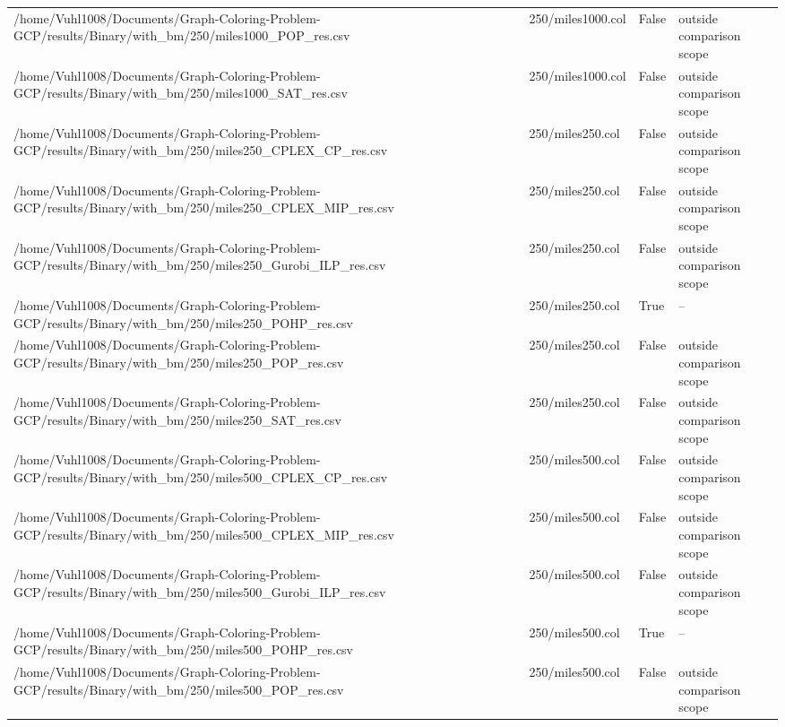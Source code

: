 \begin{table}[htbp]
\begin{tabular}{llll}
/home/Vuhl1008/Documents/Graph-Coloring-Problem-GCP/results/Binary/with\_bm/250/miles1000\_POP\_res.csv & 250/miles1000.col & False & outside comparison scope \\
/home/Vuhl1008/Documents/Graph-Coloring-Problem-GCP/results/Binary/with\_bm/250/miles1000\_SAT\_res.csv & 250/miles1000.col & False & outside comparison scope \\
/home/Vuhl1008/Documents/Graph-Coloring-Problem-GCP/results/Binary/with\_bm/250/miles250\_CPLEX\_CP\_res.csv & 250/miles250.col & False & outside comparison scope \\
/home/Vuhl1008/Documents/Graph-Coloring-Problem-GCP/results/Binary/with\_bm/250/miles250\_CPLEX\_MIP\_res.csv & 250/miles250.col & False & outside comparison scope \\
/home/Vuhl1008/Documents/Graph-Coloring-Problem-GCP/results/Binary/with\_bm/250/miles250\_Gurobi\_ILP\_res.csv & 250/miles250.col & False & outside comparison scope \\
/home/Vuhl1008/Documents/Graph-Coloring-Problem-GCP/results/Binary/with\_bm/250/miles250\_POHP\_res.csv & 250/miles250.col & True & -- \\
/home/Vuhl1008/Documents/Graph-Coloring-Problem-GCP/results/Binary/with\_bm/250/miles250\_POP\_res.csv & 250/miles250.col & False & outside comparison scope \\
/home/Vuhl1008/Documents/Graph-Coloring-Problem-GCP/results/Binary/with\_bm/250/miles250\_SAT\_res.csv & 250/miles250.col & False & outside comparison scope \\
/home/Vuhl1008/Documents/Graph-Coloring-Problem-GCP/results/Binary/with\_bm/250/miles500\_CPLEX\_CP\_res.csv & 250/miles500.col & False & outside comparison scope \\
/home/Vuhl1008/Documents/Graph-Coloring-Problem-GCP/results/Binary/with\_bm/250/miles500\_CPLEX\_MIP\_res.csv & 250/miles500.col & False & outside comparison scope \\
/home/Vuhl1008/Documents/Graph-Coloring-Problem-GCP/results/Binary/with\_bm/250/miles500\_Gurobi\_ILP\_res.csv & 250/miles500.col & False & outside comparison scope \\
/home/Vuhl1008/Documents/Graph-Coloring-Problem-GCP/results/Binary/with\_bm/250/miles500\_POHP\_res.csv & 250/miles500.col & True & -- \\
/home/Vuhl1008/Documents/Graph-Coloring-Problem-GCP/results/Binary/with\_bm/250/miles500\_POP\_res.csv & 250/miles500.col & False & outside comparison scope \\

\end{tabular}
\end{table}
